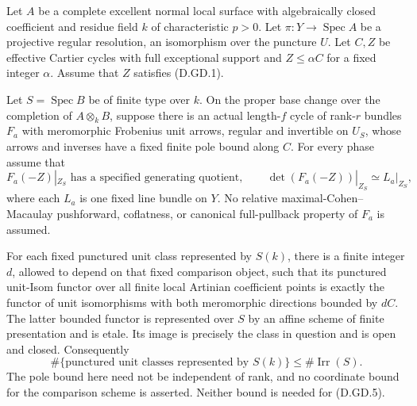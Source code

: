\begin{proposition}
\label{D:generated-fixed-determinant-unit-openness}
Let $A$ be a complete excellent normal local surface with
algebraically closed coefficient and residue field $k$ of
characteristic $p>0$. Let $\pi:Y\to\operatorname{Spec}A$
be a projective regular resolution, an isomorphism over
the puncture $U$. Let $C,Z$ be effective Cartier cycles
with full exceptional support and $Z\le\alpha C$ for a
fixed integer $\alpha$. Assume that $Z$ satisfies (D.GD.1).

Let $S=\operatorname{Spec}B$ be of finite type over $k$.
On the proper base change over the completion of
$A\otimes_k B$, suppose there is an actual length-$f$
cycle of rank-$r$ bundles $F_a$ with meromorphic Frobenius
unit arrows, regular and invertible on $U_S$, whose arrows
and inverses have a fixed finite pole bound along $C$.
For every phase assume that
\[
 F_a(-Z)|_{Z_S}\text{ has a specified generating quotient},
 \qquad
 \det(F_a(-Z))|_{Z_S}\simeq L_a|_{Z_S},                 \tag{D.GD.4}
\]
where each $L_a$ is one fixed line bundle on $Y$.
No relative maximal-Cohen--Macaulay pushforward, coflatness,
or canonical full-pullback property of $F_a$ is assumed.

For each fixed punctured unit class represented by $S(k)$,
there is a finite integer $d$, allowed to depend on that
fixed comparison object, such that its punctured unit-Isom
functor over all finite local Artinian coefficient points
is exactly the functor of unit isomorphisms with both
meromorphic directions bounded by $dC$. The latter bounded
functor is represented over $S$ by an affine scheme of
finite presentation and is etale. Its image is precisely
the class in question and is open and closed. Consequently
\[
 \#\{\text{punctured unit classes represented by }S(k)\}
                    \le\#\operatorname{Irr}(S).          \tag{D.GD.5}
\]
The pole bound here need not be independent of rank, and
no coordinate bound for the comparison scheme is asserted.
Neither bound is needed for (D.GD.5).
\end{proposition}

